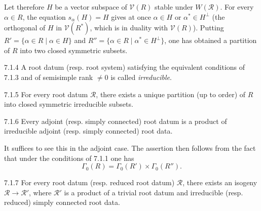 Let therefore $H$ be a vector subspace of $\mathcal V(R)$ stable under $W(\mathcal R)$. For every $\alpha\in R$, the equation $s_\alpha(H)=H$ gives at once $\alpha\in H$ or $\alpha^*\in H^\perp$ (the orthogonal of $H$ in $\mathcal V(R^*)$, which is in duality with $\mathcal V(R)$). Putting $R'=\{\alpha\in R\mid\alpha\in H\}$ and $R''=\{\alpha\in R\mid\alpha^*\in H^\perp\}$, one has obtained a partition of $R$ into two closed symmetric subsets.
\begin{definition}{7.1.4}\label{XXI.7.1.4}
A root datum (resp. root system) satisfying the equivalent conditions of 7.1.3 and of semisimple rank $\ne0$ is called \emph{irreducible}.
\end{definition}
\begin{corollary}{7.1.5}\label{XXI.7.1.5}
For every root datum $\mathcal R$, there exists a unique partition (up to order) of $R$ into closed symmetric irreducible subsets.
\end{corollary}
\begin{corollary}{7.1.6}\label{XXI.7.1.6}
Every adjoint (resp. simply connected) root datum is a product of irreducible adjoint (resp. simply connected) root data.
\end{corollary}
It suffices to see this in the adjoint case. The assertion then follows from the fact that under the conditions of 7.1.1 one has
\[
\Gamma_0(R)=\Gamma_0(R')\times\Gamma_0(R'').
\]
\begin{corollary}{7.1.7}\label{XXI.7.1.7}
For every root datum (resp. reduced root datum) $\mathcal R$, there exists an isogeny $\mathcal R\to\mathcal R'$, where $\mathcal R'$ is a product of a trivial root datum and irreducible (resp. reduced) simply connected root data.
\end{corollary}

